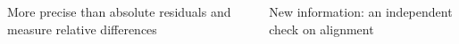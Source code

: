 \documentclass[compress]{beamer}
\begin{document}
\begin{frame}
\begin{columns}
\vspace{0.3 cm}
More precise than absolute residuals and measure relative differences

\vspace{0.3 cm}
New information: an independent check on alignment
\end{columns}
\end{frame}

\end{document}
